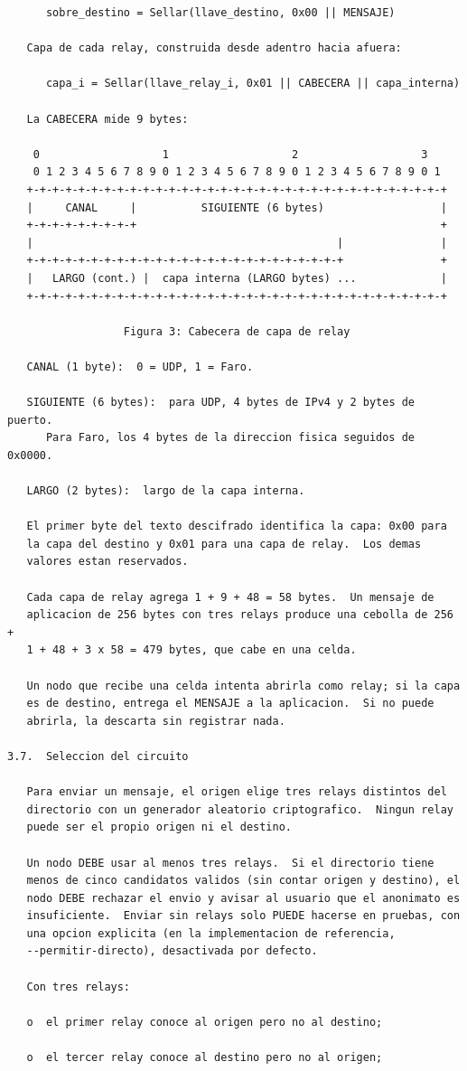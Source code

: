 \newpage
\begin{Verbatim}
      sobre_destino = Sellar(llave_destino, 0x00 || MENSAJE)

   Capa de cada relay, construida desde adentro hacia afuera:

      capa_i = Sellar(llave_relay_i, 0x01 || CABECERA || capa_interna)

   La CABECERA mide 9 bytes:

    0                   1                   2                   3
    0 1 2 3 4 5 6 7 8 9 0 1 2 3 4 5 6 7 8 9 0 1 2 3 4 5 6 7 8 9 0 1
   +-+-+-+-+-+-+-+-+-+-+-+-+-+-+-+-+-+-+-+-+-+-+-+-+-+-+-+-+-+-+-+-+
   |     CANAL     |          SIGUIENTE (6 bytes)                  |
   +-+-+-+-+-+-+-+-+                                               +
   |                                               |               |
   +-+-+-+-+-+-+-+-+-+-+-+-+-+-+-+-+-+-+-+-+-+-+-+-+               +
   |   LARGO (cont.) |  capa interna (LARGO bytes) ...             |
   +-+-+-+-+-+-+-+-+-+-+-+-+-+-+-+-+-+-+-+-+-+-+-+-+-+-+-+-+-+-+-+-+

                  Figura 3: Cabecera de capa de relay

   CANAL (1 byte):  0 = UDP, 1 = Faro.

   SIGUIENTE (6 bytes):  para UDP, 4 bytes de IPv4 y 2 bytes de puerto.
      Para Faro, los 4 bytes de la direccion fisica seguidos de 0x0000.

   LARGO (2 bytes):  largo de la capa interna.

   El primer byte del texto descifrado identifica la capa: 0x00 para
   la capa del destino y 0x01 para una capa de relay.  Los demas
   valores estan reservados.

   Cada capa de relay agrega 1 + 9 + 48 = 58 bytes.  Un mensaje de
   aplicacion de 256 bytes con tres relays produce una cebolla de 256 +
   1 + 48 + 3 x 58 = 479 bytes, que cabe en una celda.

   Un nodo que recibe una celda intenta abrirla como relay; si la capa
   es de destino, entrega el MENSAJE a la aplicacion.  Si no puede
   abrirla, la descarta sin registrar nada.

3.7.  Seleccion del circuito

   Para enviar un mensaje, el origen elige tres relays distintos del
   directorio con un generador aleatorio criptografico.  Ningun relay
   puede ser el propio origen ni el destino.

   Un nodo DEBE usar al menos tres relays.  Si el directorio tiene
   menos de cinco candidatos validos (sin contar origen y destino), el
   nodo DEBE rechazar el envio y avisar al usuario que el anonimato es
   insuficiente.  Enviar sin relays solo PUEDE hacerse en pruebas, con
   una opcion explicita (en la implementacion de referencia,
   --permitir-directo), desactivada por defecto.

   Con tres relays:

   o  el primer relay conoce al origen pero no al destino;

   o  el tercer relay conoce al destino pero no al origen;
\end{Verbatim}
